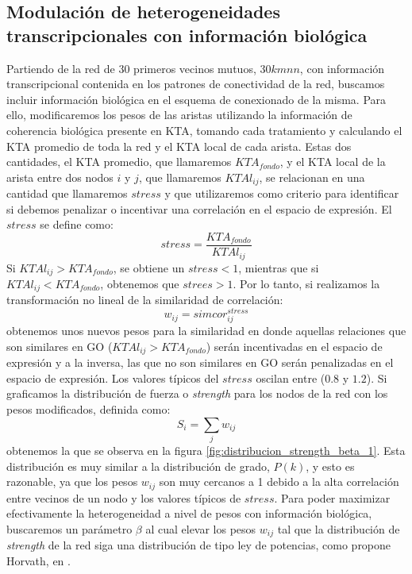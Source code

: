 \subsection{Modulación de heterogeneidades transcripcionales con información biológica}
Partiendo de la red de 30 primeros vecinos mutuos, $30kmnn$, con información transcripcional contenida en los patrones de conectividad de la red, buscamos incluir información biológica en el esquema de conexionado de la misma. Para ello, modificaremos los pesos de las aristas utilizando la información de coherencia biológica presente en KTA, tomando cada tratamiento y calculando el KTA promedio de toda la red y el KTA local de cada arista. Estas dos cantidades, el KTA promedio, que llamaremos $KTA_{fondo}$, y el KTA local de la arista entre dos nodos $i$ y $j$, que llamaremos $KTAl_{ij}$, se relacionan en una cantidad que llamaremos $stress$ y que utilizaremos como criterio para identificar si debemos penalizar o incentivar una correlación en el espacio de expresión. El $stress$ se define como:
\begin{equation}
	stress = \frac{KTA_{fondo}}{KTAl_{ij}}
	\label{eq:stress}
\end{equation}
Si $KTAl_{ij} > KTA_{fondo}$, se obtiene un $stress < 1$, mientras que si $KTAl_{ij} < KTA_{fondo}$, obtenemos que $strees > 1$. Por lo tanto, si realizamos la transformación no lineal de la similaridad de correlación:
\begin{equation}
	w_{ij} = simcor_{ij}^{stress}
	\label{eq:pesos_de_la_red}
\end{equation}
obtenemos unos nuevos pesos para la similaridad en donde aquellas relaciones que son similares en GO ($KTAl_{ij} > KTA_{fondo}$) serán incentivadas en el espacio de expresión y a la inversa, las que no son similares en GO serán penalizadas en el espacio de expresión. Los valores típicos del $stress$ oscilan entre ($0.8$ y $1.2$). Si graficamos la distribución de fuerza o \textit{strength} para los nodos de la red con los pesos modificados, definida como:
\begin{equation}
	S_i = \sum_j w_{ij}
	\label{eq:strength}
\end{equation}
obtenemos la que se observa en la figura \ref{fig:distribucion_strength_beta_1}. Esta distribución es muy similar a la distribución de grado, $P(k)$, y esto es razonable, ya que los pesos $w_{ij}$ son muy cercanos a 1 debido a la alta correlación entre vecinos de un nodo y los valores típicos de $stress$. Para poder maximizar efectivamente la heterogeneidad a nivel de pesos con información biológica, buscaremos un parámetro $\beta$ al cual elevar los pesos $w_{ij}$ tal que la distribución de \textit{strength} de la red siga una distribución de tipo ley de potencias, como propone Horvath, en \cite{Horvath2005}.\\\\
